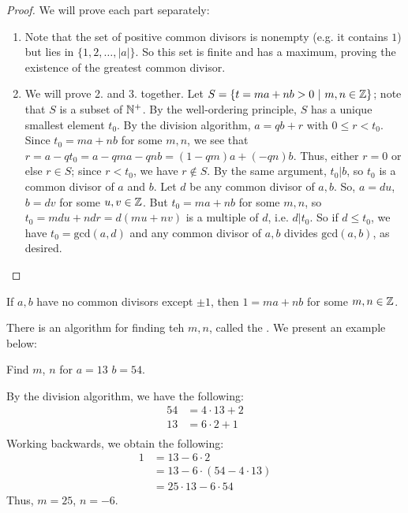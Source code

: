 \documentclass[12pt]{scrartcl}
\begin{document}
\begin{proof}
    We will prove each part separately:
        \begin{enumerate}
            \item Note that the set of positive common divisors is nonempty (e.g. it contains $1$) but lies in $\{1, 2, \ldots, |a|\}$. So this set is finite and has a maximum, proving the existence of the greatest common divisor.

            \item We will prove 2. and 3. together. Let $S = \{t = ma + nb > 0 \ | \ m, n \in \mathbb Z\}$; note that $S$ is a subset of $\mathbb N^+$. By the well-ordering principle, $S$ has a unique smallest element $t_0$. By the division algorithm, $a = qb + r$ with $0 \leq r < t_0$. Since $t_0 = ma + nb$ for some $m, n$, we see that $r = a-qt_0 = a-qma-qnb = (1-qm)a + (-qn)b$. Thus, either $r = 0$ or else $r \in S$; since $r < t_0$, we have $r \notin S$. By the same argument, $t_0 | b$, so $t_0$ is a common divisor of $a$ and $b$. Let $d$ be any common divisor of $a, b$. So, $a = du$, $b = dv$ for some $u, v \in \mathbb Z$. But $t_0 = ma + nb$ for some $m, n$, so $t_0 = mdu + ndr = d(mu + nv)$ is a multiple of $d$, i.e. $d|t_0$. So if $ d \leq t_0$, we have $t_0 = \text{gcd}(a, d)$ and any common divisor of $a, b$ divides $\text{gcd}(a, b)$, as desired.
        \end{enumerate}
\end{proof}

\begin{corollary}
    If $a, b$ have no common divisors except $\pm 1$, then $1 = ma + nb$ for some $m, n \in \mathbb Z$.
\end{corollary}

There is an algorithm for finding teh $m, n$, called the . We present an example below:

\begin{example}
    Find $m$, $n$ for $a = 13$ $b = 54$.
\end{example}
\begin{soln}
    By the division algorithm, we have the following:
            \begin{align*}
                54 &= 4 \cdot 13 + 2 \\
                13 &= 6 \cdot 2 + 1 \\
            \end{align*}
        Working backwards, we obtain the following:
            \begin{align*}
                1 &= 13 - 6 \cdot 2 \\
                  &= 13 - 6 \cdot (54 - 4 \cdot 13) \\
                  &= 25 \cdot 13 - 6 \cdot 54
            \end{align*}
        Thus, $m = 25$, $n = -6$.
\end{soln}
\end{document}
